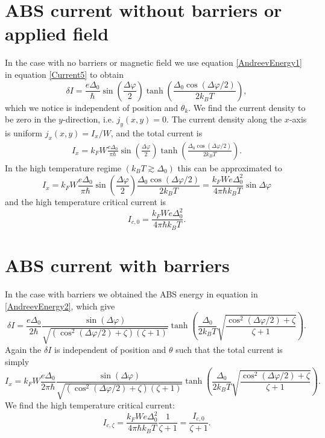 \section{ABS current without barriers or applied field}
In the case with no barriers or magnetic field we use equation \eqref{AndreevEnergy1} in equation \eqref{Current5} to obtain
\begin{equation}
    \delta I = \frac{e\Delta_0}{\hbar}\sin\left(\frac{\Delta\varphi}{2}\right)\tanh\left(\frac{\Delta_0\cos(\Delta\varphi/2)}{2k_BT}\right),
\end{equation}
which we notice is independent of position and $\theta_k$. We find the current density to be zero in the $y$-direction, i.e. $j_y(x,y) = 0$. The current density along the $x$-axis is uniform $j_x(x,y) = I_x/W$, and the total current is
\begin{equation}
\begin{split}
   I_x = k_F W\frac{e\Delta_0}{\pi \hbar} \sin\left(\frac{\Delta\varphi}{2}\right)\tanh\left(\frac{\Delta_0\cos(\Delta\varphi/2)}{2k_BT}\right).
\end{split}
\label{TotalCurrent}
\end{equation}
In the high temperature regime $(k_BT \gtrsim \Delta_0)$ this can be approximated to
\begin{equation}
    I_x = k_F W\frac{e\Delta_0}{\pi \hbar} \sin\left(\frac{\Delta\varphi}{2}\right)\frac{\Delta_0\cos(\Delta\varphi/2)}{2k_BT} =\frac{ k_F W e\Delta_0^2}{4\pi \hbar k_BT}\sin \Delta \varphi
\end{equation}
and the high temperature critical current is
\begin{equation}
    I_{c,0} = \frac{k_F W e\Delta_0^2}{4\pi \hbar k_BT}.
\label{Ic0-highT}
\end{equation}


\section{ABS current with barriers}
In the case with barriers we obtained the ABS energy in equation in \eqref{AndreevEnergy2}, which give
\begin{equation}
\delta I = \frac{e \Delta_0}{2 \hbar}\frac{\sin(\Delta \varphi)}{\sqrt{(\cos^2(\Delta \varphi /2 )+ \zeta)(\zeta + 1)}}\tanh\left(\frac{\Delta_0}{2k_BT}\sqrt{\frac{\cos^2(\Delta \varphi/2) + \zeta}{\zeta + 1}}\right).
\end{equation}
Again the $\delta I $ is independent of position and $\theta$ such that the total current is simply
\begin{equation}
I_x = k_FW \frac{e \Delta_0}{2 \pi \hbar}\frac{\sin(\Delta \varphi)}{\sqrt{(\cos^2(\Delta \varphi /2 )+ \zeta)(\zeta + 1)}}\tanh\left(\frac{\Delta_0}{2k_BT}\sqrt{\frac{\cos^2(\Delta \varphi/2) + \zeta}{\zeta + 1}}\right).
\end{equation}
We find the high temperature critical current:
\begin{equation}
I_{c,\zeta} = \frac{k_F W e\Delta_0^2}{4\pi \hbar k_BT}\frac{1}{\zeta + 1} = \frac{I_{c,0}}{\zeta+1}.
\end{equation}

